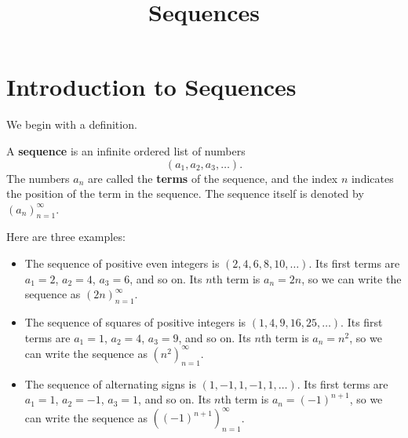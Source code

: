 \documentclass{article}
\title{Sequences}
\author{}
\date{}
\begin{document}
\maketitle

\section{Introduction to Sequences}\label{sec:sequences-intro}

We begin with a definition.

\begin{definition}\label{def:sequence}
A \textbf{sequence} is an infinite ordered list of numbers
\[(a_1, a_2, a_3, \ldots).\]
The numbers \(a_n\) are called the \textbf{terms} of the sequence, and the index \(n\) indicates the position of the term in the sequence. The sequence itself is denoted by \((a_n)_{n=1}^\infty\).
\end{definition}

\begin{example}\label{ex:sequence-example}
Here are three examples:
\begin{itemize}
    \item The sequence of positive even integers is
    \((2, 4, 6, 8, 10, \ldots)\). Its first terms are
    \(a_1 = 2\), \(a_2 = 4\), \(a_3 = 6\), and so on. Its \(n\)th term is \(a_n = 2n\), so we can write the sequence as \((2n)_{n=1}^\infty\).
    \item The sequence of squares of positive integers is
    \((1, 4, 9, 16, 25, \ldots)\). Its first terms are
    \(a_1 = 1\), \(a_2 = 4\), \(a_3 = 9\), and so on. Its \(n\)th term is \(a_n = n^2\), so we can write the sequence as \((n^2)_{n=1}^\infty\).
    \item The sequence of alternating signs is
    \((1, -1, 1, -1, 1, \ldots)\). Its first terms are
    \(a_1 = 1\), \(a_2 = -1\), \(a_3 = 1\), and so on. Its \(n\)th term is \(a_n = (-1)^{n+1}\), so we can write the sequence as \(((-1)^{n+1})_{n=1}^\infty\).
\end{itemize}
\end{example}
\end{document}
